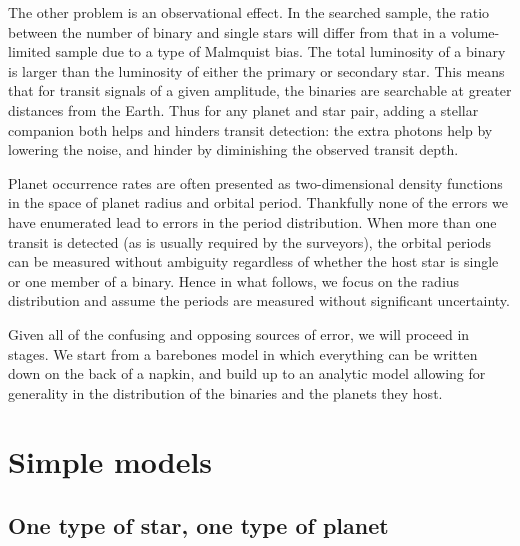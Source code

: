 \documentclass[12pt,modern]{aastex61}
\begin{document}
The other problem is an observational effect. In the searched sample,
the ratio between the number of binary and single stars will differ
from that in a volume-limited sample due to a type of Malmquist bias.
The total luminosity of a binary is larger than the luminosity of
either the primary or secondary star.  This means that for transit
signals of a given amplitude, the binaries are searchable at greater
distances from the Earth.  Thus for any planet and star pair, adding a
stellar companion both helps and hinders transit detection: the extra
photons help by lowering the noise, and hinder by diminishing the
observed transit depth.

Planet occurrence rates are often presented as two-dimensional density
functions in the space of planet radius and orbital period.
Thankfully none of the errors we have enumerated lead to errors in the
period distribution.  When more than one transit is detected (as is
usually required by the surveyors), the orbital periods can be
measured without ambiguity regardless of whether the host star is
single or one member of a binary.  Hence in what follows, we focus on
the radius distribution and assume the periods are measured without
significant uncertainty.

Given all of the confusing and opposing sources of error, we will
proceed in stages. We start from a barebones model in which everything
can be written down on the back of a napkin, and build up to an
analytic model allowing for generality in the distribution of the
binaries and the planets they host.  



\section{Simple models}
\label{sec:simplest}

\subsection{One type of star, one type of planet}
\label{sec:model_1}
\end{document}
